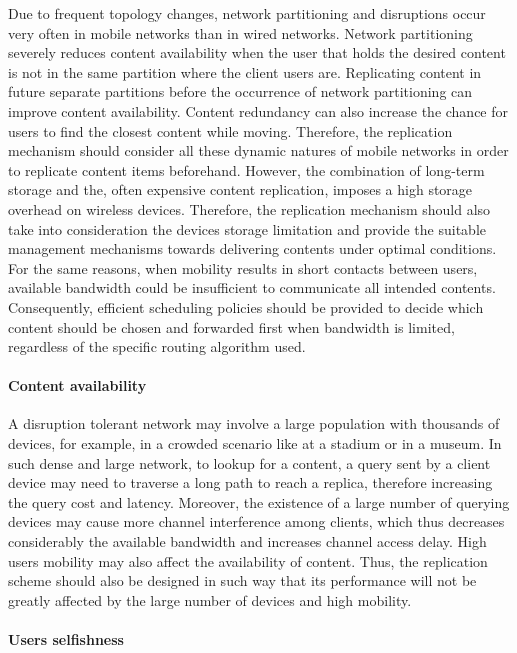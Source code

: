 Due to frequent topology changes, network partitioning and disruptions occur very often in mobile networks than in wired networks. Network partitioning severely reduces content availability when the user that holds the desired content is not in the same partition where the client users are. Replicating content in future separate partitions before the occurrence of network partitioning can improve content availability. Content redundancy can also increase the chance for users to find the closest content while moving. Therefore, the replication mechanism should consider all these dynamic natures of mobile networks in order to replicate content items beforehand. However, the combination of long-term storage and the, often expensive content replication, imposes a high storage overhead on wireless devices. Therefore, the replication mechanism should also take into consideration the devices storage limitation and provide the suitable management mechanisms towards delivering contents under optimal conditions. For the same reasons, when mobility results in short contacts between users, available bandwidth could be insufficient to communicate all intended contents. Consequently, efficient scheduling policies should be provided to decide which content should be chosen and forwarded first when bandwidth is limited, regardless of the specific routing algorithm used.

\paragraph{Content availability}

A disruption tolerant network may involve a large population with thousands of devices, for example, in a crowded scenario like at a stadium or in a museum. In such dense and large network, to lookup for a content, a query sent by a client device may need to traverse a long path to reach a replica, therefore increasing the query cost and latency. Moreover, the existence of a large number of querying devices may cause more channel interference among clients, which thus decreases considerably the available bandwidth and increases channel
access delay. High users mobility may also affect the availability of content. Thus, the replication scheme should also be designed in such way that its performance will not be greatly affected by the large number of devices and high mobility.

\paragraph{Users selfishness}

